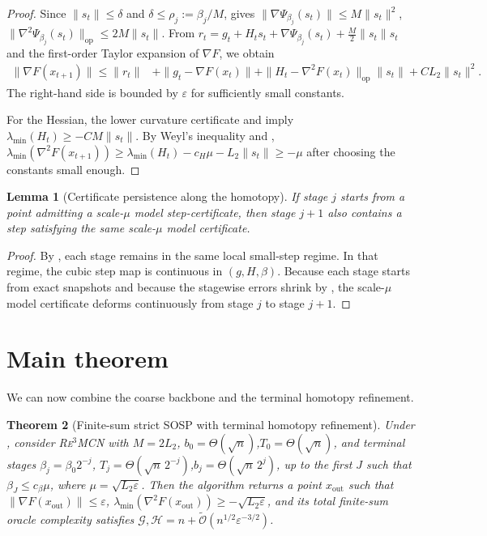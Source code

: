 \documentclass{article}
\theoremstyle{plain}
\newtheorem{theorem}{Theorem}[section]
\newtheorem{lemma}[theorem]{Lemma}
\theoremstyle{definition}
\theoremstyle{remark}
\begin{document}
\begin{proof}
Since \(\|s_t\|\le \delta\) and \(\delta\le \rho_j:=\beta_j/M\),  gives
$
\|\nabla\Psi_{\beta_j}(s_t)\|\le M\|s_t\|^2$,
$
\|\nabla^2\Psi_{\beta_j}(s_t)\|_{\mathrm{op}}\le 2M\|s_t\|$. From $r_t
=
g_t+H_t s_t+\nabla\Psi_{\beta_j}(s_t)+\frac M2\|s_t\|s_t$
and the first-order Taylor expansion of \(\nabla F\), we obtain
\begin{align*}
\|\nabla F(x_{t+1})\|
\le
\|r_t\|
&+\|g_t-\nabla F(x_t)\| +\|H_t-\nabla^2F(x_t)\|_{\mathrm{op}}\|s_t\|+C L_2\|s_t\|^2.
\end{align*}
The right-hand side is bounded by \(\varepsilon\) for sufficiently small constants.

For the Hessian, the lower curvature certificate and  imply $\lambda_{\min}(H_t)\ge -C M\|s_t\|$.
By Weyl's inequality and ,
$
\lambda_{\min}(\nabla^2F(x_{t+1}))
\ge
\lambda_{\min}(H_t)-c_H\mu-L_2\|s_t\|
\ge -\mu
$
after choosing the constants small enough.
\end{proof}

\begin{lemma}[Certificate persistence along the homotopy]\label{lem:persist-main}
If stage \(j\) starts from a point admitting a scale-\(\mu\) model step-certificate, then stage \(j+1\) also contains a step satisfying the same scale-\(\mu\) model certificate.
\end{lemma}

\begin{proof}
By , each stage remains in the same local small-step regime. In that regime, the cubic step map is continuous in \((g,H,\beta)\). Because each stage starts from exact snapshots and because the stagewise errors shrink by , the scale-\(\mu\) model certificate deforms continuously from stage \(j\) to stage \(j+1\).
\end{proof}

\section{Main theorem}\label{sec:main}

We can now combine the coarse backbone and the terminal homotopy refinement.

\begin{theorem}[Finite-sum strict SOSP with terminal homotopy refinement]\label{thm:main}
Under , consider \textsc{Re$^3$MCN} with
$M=2L_2$, $b_0=\Theta(\sqrt n)$,$T_0=\Theta(\sqrt n)$,
and terminal stages $\beta_j=\beta_0 2^{-j}$,
$T_j=\Theta(\sqrt n\,2^{-j})$,$b_j=\Theta(\sqrt n\,2^j)$,
up to the first \(J\) such that \(\beta_J\le c_\beta\mu\), where \(\mu=\sqrt{L_2\varepsilon}\). Then the algorithm returns a point \(x_{\mathrm{out}}\) such that $
\|\nabla F(x_{\mathrm{out}})\|\le \varepsilon$, $\lambda_{\min}(\nabla^2F(x_{\mathrm{out}}))\ge -\sqrt{L_2\varepsilon}$,
and its total finite-sum oracle complexity satisfies
$\mathcal G,\mathcal H
=
n+\widetilde{\mathcal O}\!\left(n^{1/2}\varepsilon^{-3/2}\right)$.
\end{theorem}
\end{document}
